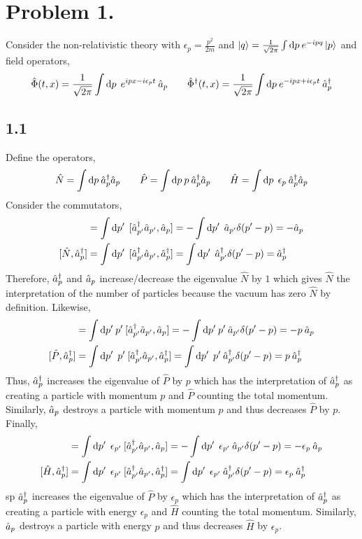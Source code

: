 \documentclass[12pt]{extarticle}
\begin{document}
 
\section*{Problem 1.}
Consider the non-relativistic theory with $\epsilon_p = \frac{p^2}{2m}$ and $\left| q \right> = \frac{1}{\sqrt{2 \pi}} \int \mathrm{d}p \: e^{-ipq} \left| p \right>$ and field operators,
\[ \hat{\Phi}(t, x) = \frac{1}{\sqrt{2 \pi}} \int \mathrm{d}p \: \: e^{ipx - i \epsilon_p t} \: \hat{a}_p \quad \quad \hat{\Phi}^\dagger(t, x) = \frac{1}{\sqrt{2 \pi}} \int \mathrm{d}p \: e^{- i px + i \epsilon_p t} \: \hat{a}^\dagger_p\]
\subsection*{1.1}
Define the operators, 
\[ \hat{N} = \int \mathrm{d}p \: \hat{a}^\dagger_p \hat{a}_p \quad \quad \hat{P} = \int \mathrm{d}p \:  p \: \hat{a}^\dagger_p \hat{a}_p \quad \quad \hat{H} = \int \mathrm{d}p \: \: \epsilon_p \: \hat{a}^\dagger_p \hat{a}_p \]
Consider the commutators,
\begin{align*}
[\hat{N}, \a_p] & = \int \d{p'} \: [\adag_{p'} \a_{p'}, \a_p] = - \int \d{p'} \: \a_{p'} \delta(p' - p) = - \a_p \\
[\hat{N}, \adag_p] & = \int \d{p'} \: [\adag_{p'} \a_{p'}, \adag_p] = \int \d{p'} \: \adag_{p'} \delta(p' - p) = \adag_p
\end{align*}
Therefore, $\hat{a}^\dagger_p$ and $\hat{a}_p$ increase/decrease the eigenvalue $\hat{N}$ by $1$ which gives $\hat{N}$ the interpretation of the number of particles because the vacuum has zero $\hat{N}$ by definition. Likewise,
\begin{align*}
[\hat{P}, \a_p] & = \int \d{p'} p' \: [\adag_{p'} \a_{p'}, \a_p] = - \int \d{p'} p' \: \a_{p'} \delta(p' - p) = -p \: \a_p \\
[\hat{P}, \adag_p] & = \int \d{p'} \: p' \: [\adag_{p'} \a_{p'}, \adag_p] = \int \d{p'} \: p' \: \adag_{p'} \delta(p' - p) = p \: \adag_p
\end{align*}
Thus, $\hat{a}^\dagger_p$ increases the eigenvalue of $\hat{P}$ by $p$ which has the interpretation of $\hat{a}^\dagger_p$ as creating a particle with momentum $p$ and $\hat{P}$ counting the total momentum. Similarly, $\hat{a}_p$ destroys a particle with momentum $p$ and thus decreases $\hat{P}$ by $p$. Finally,
\begin{align*}
[\hat{H}, \a_p] & = \int \d{p'} \: \epsilon_{p'} \: [\adag_{p'} \a_{p'}, \a_p] = - \int \d{p'} \: \epsilon_{p'} \: \a_{p'} \delta(p' - p) = -\epsilon_{p} \: \a_p \\
[\hat{H}, \adag_p] & = \int \d{p'} \: \epsilon_{p'} \: [\adag_{p'} \a_{p'}, \adag_p] = \int \d{p'} \: \epsilon_{p'} \: \adag_{p'} \delta(p' - p) = \epsilon_{p} \: \adag_p
\end{align*}
sp $\hat{a}^\dagger_p$ increases the eigenvalue of $\hat{P}$ by $\epsilon_p$ which has the interpretation of $\hat{a}^\dagger_p$ as creating a particle with energy $\epsilon_p$ and $\hat{H}$ counting the total momentum. Similarly, $\hat{a}_p$ destroys a particle with energy $p$ and thus decreases $\hat{H}$ by $\epsilon_p$.
\end{document}
